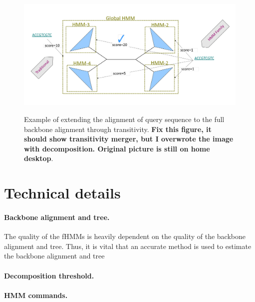 \begin{figure}[htbp]
\centering
{\includegraphics[width=1.0\textwidth]{hmmfamily/alignment}}
\caption[Example of alignment of query sequence through transitivity.]{Example of extending the alignment of query sequence to the full backbone alignment through transitivity.  \textbf{Fix this figure, it should show transitivity merger, but I overwrote the image with decomposition.  Original picture is still on home desktop}.} 
\label{hmmfamily:trans}
\end{figure}


\section{Technical details}\label{hmmfamily:modification}
\paragraph{Backbone alignment and tree.}  The quality of the fHMMs is heavily dependent on the quality of the backbone alignment and tree.  Thus, it is vital that an accurate method is used to estimate the backbone alignment and tree
\paragraph{Decomposition threshold.}
\paragraph{HMM commands.}



